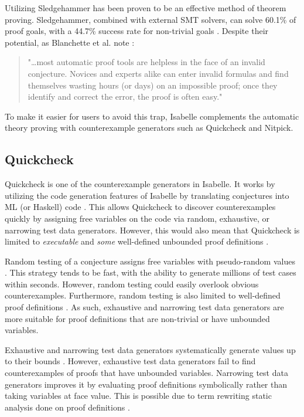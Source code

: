 Utilizing Sledgehammer has been proven to be an effective method of theorem proving. Sledgehammer, combined with external SMT solvers, can 
solve 60.1\% of proof goals, with a 44.7\% success rate for non-trivial goals \cite[Sec. 6]{isabelleSledgehammerSMT}. Despite their 
potential, as Blanchette et al. note \cite[p. 2]{isabelleProof}:

\begin{quote}
    "\dots most automatic proof tools are helpless in the face of an invalid conjecture. Novices and experts alike can enter invalid formulas and 
    find themselves wasting hours (or days) on an impossible proof; once they identify and correct the error, the proof is often easy."
\end{quote}

To make it easier for users to avoid this trap, Isabelle complements the automatic theory proving with counterexample generators such as Quickcheck 
and Nitpick.

\subsection{Quickcheck}
\label{sec:Quickcheck}

Quickcheck is one of the counterexample generators in Isabelle. It works by utilizing the code generation features of Isabelle by translating 
conjectures into ML (or Haskell) code \cite{isabelleQuickcheck}. This allows Quickcheck to discover counterexamples quickly by assigning 
free variables on the code via random, exhaustive, or narrowing test data generators. However, this would also mean that Quickcheck is limited 
to \emph{executable} and \emph{some} well-defined unbounded proof definitions \cite{isabelleQuickcheck}.

Random testing of a conjecture assigns free variables with pseudo-random values \cite[Sec. 3.1]{isabelleQuickcheck}. This strategy tends to be fast, 
with the ability to generate millions of test cases within seconds. However, random testing could easily overlook obvious counterexamples. 
Furthermore, random testing is also limited to well-defined proof definitions \cite{isabelleQuickcheck}. As such, exhaustive and narrowing 
test data generators are more suitable for proof definitions that are non-trivial or have unbounded variables.

Exhaustive and narrowing test data generators systematically generate values up to their bounds \cite{isabelleQuickcheck}. 
However, exhaustive test data generators fail to find counterexamples of proofs that have unbounded variables. Narrowing test data generators 
improves it by evaluating proof definitions symbolically rather than taking variables at face value. This is possible due to 
term rewriting static analysis done on proof definitions \cite[Sec. 5]{isabelleQuickcheck}.


